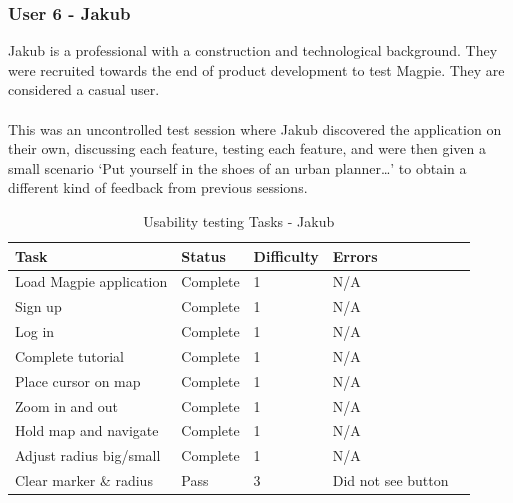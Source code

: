 \subsubsection{User 6 - Jakub}
Jakub is a professional with a construction and technological background. They were recruited towards the end of product development to test Magpie. They are considered a casual user.\\ \\
This was an uncontrolled test session where Jakub discovered the application on their own, discussing each feature, testing each feature, and were then given a small scenario `Put yourself in the shoes of an urban planner\ldots' to obtain a different kind of feedback from previous sessions.\\
\begin{table}[h!]
    \centering
    \caption{Usability testing Tasks - Jakub}
    \begin{tabular}{|p{}|p{}|p{}|p{}|p{}|}
        \hline
        \textbf{Task}                 & \textbf{Status} & \textbf{Difficulty} & \textbf{Errors}    \\
        \hline
        Load Magpie application       & Complete        & 1                   & N/A                \\
        \hline
        Sign up                       & Complete        & 1                   & N/A                \\
        \hline
        Log in                        & Complete        & 1                   & N/A                \\
        \hline
        Complete tutorial             & Complete        & 1                   & N/A                \\
        \hline
        Place cursor on map           & Complete        & 1                   & N/A                \\
        \hline
        Zoom in and out               & Complete        & 1                   & N/A                \\
        \hline
        Hold map and navigate         & Complete        & 1                   & N/A                \\
        \hline
        Adjust radius big/small       & Complete        & 1                   & N/A                \\
        \hline
        Clear marker \& radius        & Pass            & 3                   & Did not see button \\

\end{tabular}
\end{table}
